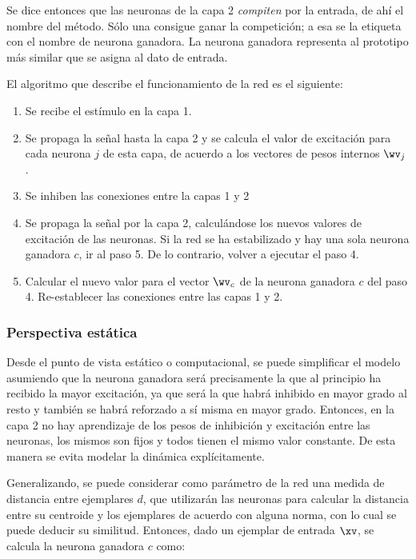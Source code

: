 Se dice entonces que las neuronas de la capa 2 \textit{compiten} por la entrada, de ahí el nombre del método. Sólo una consigue ganar la competición; a esa se la etiqueta con el nombre de neurona ganadora. La neurona ganadora representa al prototipo más similar que se asigna al dato de entrada.

El algoritmo que describe el funcionamiento de la red es el siguiente:

\begin{enumerate}
\item Se recibe el estímulo en la capa 1.
\item Se propaga la señal hasta la capa 2 y se calcula el valor de excitación para cada neurona $j$ de esta capa, de acuerdo a los vectores de pesos internos $\wv_j$ .
\item Se inhiben las conexiones entre la capas 1 y 2
\item Se propaga la señal por la capa 2, calculándose los nuevos valores de excitación de las neuronas.
Si la red se ha estabilizado y hay una sola neurona ganadora $c$, ir al paso 5. De lo contrario, volver a ejecutar el paso 4. 
\item Calcular el nuevo valor para el vector $\wv_c$ de la neurona ganadora $c$ del paso 4.
Re-establecer las conexiones entre las capas 1 y 2.
\end{enumerate} 

\subsubsection*{Perspectiva estática}

Desde el punto de vista estático o computacional, se puede simplificar el modelo asumiendo que la neurona ganadora será precisamente la que al principio ha recibido la mayor excitación, ya que será la que habrá inhibido en mayor grado al resto y también se habrá reforzado a sí misma en mayor grado. Entonces, en la capa 2 no hay aprendizaje de los pesos de inhibición y excitación entre las neuronas, los mismos son fijos y todos tienen el mismo valor constante. De esta manera se evita modelar la dinámica explícitamente. 




Generalizando, se puede considerar como parámetro de la red una medida de distancia entre ejemplares $d$, que utilizarán las neuronas para calcular la distancia entre su centroide y los ejemplares de acuerdo con alguna norma, con lo cual se puede deducir su similitud. Entonces, dado un ejemplar de entrada $\xv$, se calcula la neurona ganadora $c$ como:

